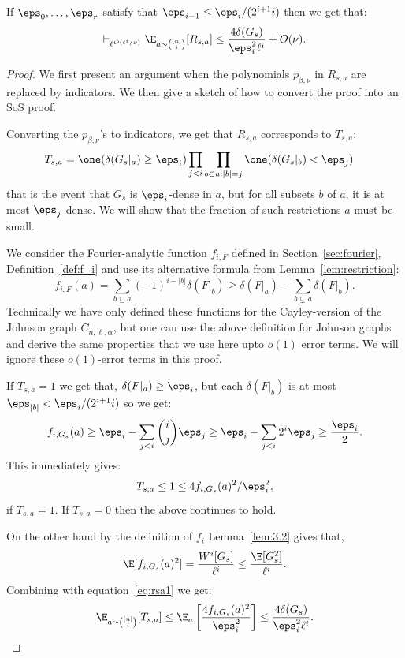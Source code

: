 \begin{claim}\label{claim:dense-subcubes}
If $\eps_0, \ldots, \eps_r$ satisfy that $\eps_{i-1} \leq \eps_i/(2^{i+1} i)$ then we get that:
\[\vdash_{\ell^{O(\ell^i/\nu)}} \E_{a \sim {[n] \choose i}}[R_{s,a}] \leq \frac{4\delta(G_s)}{\eps_i^2\ell^i} + O(\nu).\]
\end{claim}
\begin{proof}
We first present an argument when the polynomials $p_{\beta,\nu}$ in $R_{s,a}$ are replaced by indicators. We then give a sketch of how to convert the proof into an SoS proof. 

Converting the $p_{\beta,\nu}$'s to indicators, we get that $R_{s,a}$ corresponds to $T_{s,a}$: 
\begin{align*}
    T_{s,a} 
    &= \one(\delta(G_s|_a) \geq \eps_i) \prod_{j < i}\prod_{b \subset a: |b| 
    = j}\one(\delta(G_s|_b) < \eps_j)
\end{align*}
that is the event that $G_s$ is $\eps_i$-dense in $a$, but for all subsets $b$ of $a$, it is at most $\eps_j$-dense. We will show that the fraction of such restrictions $a$ must be small.

We consider the Fourier-analytic function $f_{i,F}$ defined in Section~\ref{sec:fourier}, Definition~\ref{def:f_i} and use its alternative formula from Lemma~\ref{lem:restriction}:
\[f_{i,F}(a) = \sum_{b \subseteq a} (-1)^{i -|b|}\delta(F|_b) \geq \delta(F|_a) - \sum_{b \subsetneq a} \delta(F|_b).\]
Technically we have only defined these functions for the Cayley-version of the Johnson graph $C_{n,\ell,\alpha}$, but one can use the above definition for Johnson graphs and derive the same properties that we use here upto $o(1)$ error terms. We will ignore these $o(1)$-error terms in this proof.

If $T_{s,a} = 1$ we get that, $\delta(F|_a) \geq \eps_i$, but each $\delta(F|_b)$ is at most $\eps_{|b|} < \eps_i/(2^{i+1} i)$ so we get:
\[f_{i,G_s}(a) \geq \eps_i - \sum_{j < i} {i \choose j}\eps_j \geq \eps_i - \sum_{j < i} 2^i \eps_j \geq \frac{\eps_i}{2}.\]
This immediately gives: 
\begin{equation}\label{eq:rsa1}
T_{s,a} \leq 1 \leq 4f_{i,G_s}(a)^2/\eps_i^2,
\end{equation}
if $T_{s,a} = 1$. If $T_{s,a} = 0$ then the above continues to hold.

On the other hand by the definition of $f_{i}$ Lemma~\ref{lem:3.2} gives that, 
\[\E[f_{i,G_s}(a)^2] = \frac{W^i[G_s]}{\ell^i} \leq \frac{\E[G_s^2]}{\ell^i}.\]
Combining with equation~\ref{eq:rsa1} we get:
\[\E_{a \sim {[n] \choose i}}[T_{s,a}] \leq \E_{a}\left[\frac{4f_{i,G_s}(a)^2}{\eps_i^2}\right] \leq \frac{4\delta(G_s)}{\eps_i^2\ell^i}.\]


\end{proof}
